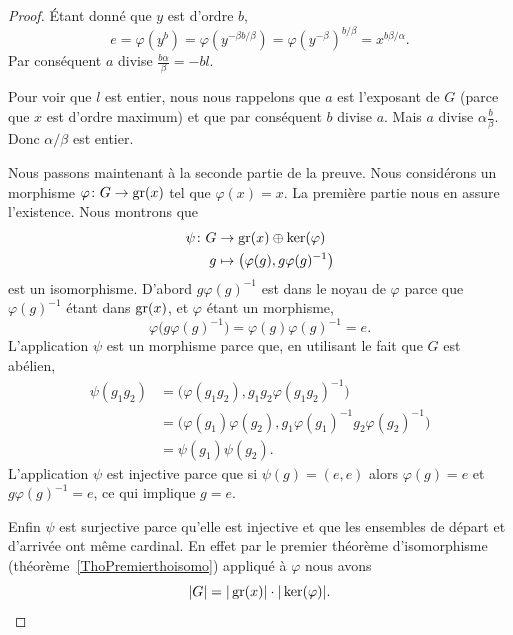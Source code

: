 \begin{proof}
    Étant donné que \( y\) est d'ordre \( b\),
    \begin{equation}
        e=\varphi(y^b)=\varphi(y^{-\beta b/\beta})=\varphi(y^{-\beta})^{b/\beta}=x^{b\beta/\alpha}.
    \end{equation}
    Par conséquent \( a\) divise \( \frac{ b\alpha }{ \beta }=-bl\).

    Pour voir que \( l\) est entier, nous nous rappelons que \( a\) est l'exposant de \( G\) (parce que \( x\) est d'ordre maximum) et que par conséquent \( b\) divise \( a\). Mais \( a\) divise \( \alpha\frac{ b }{ \beta }\). Donc \( \alpha/\beta\) est entier.

    Nous passons maintenant à la seconde partie de la preuve. Nous considérons un morphisme \( \varphi\colon G\to \operatorname{gr}(x)\) tel que \( \varphi(x)=x\). La première partie nous en assure l'existence. Nous montrons que
    \begin{equation}
        \begin{aligned}
            \psi\colon G&\to \operatorname{gr}(x)\oplus \ker(\varphi) \\
            g&\mapsto \big( \varphi(g),g\varphi(g)^{-1} \big)
        \end{aligned}
    \end{equation}
    est un isomorphisme. D'abord \( g\varphi(g)^{-1}\) est dans le noyau de \( \varphi\) parce que \( \varphi(g)^{-1}\) étant dans \( \operatorname{gr}(x)\), et \( \varphi\) étant un morphisme,
    \begin{equation}
        \varphi\big( g\varphi(g)^{-1} \big)=\varphi(g)\varphi(g)^{-1}=e.
    \end{equation}
    L'application \( \psi\) est un morphisme parce que, en utilisant le fait que \( G\) est abélien,
    \begin{subequations}
        \begin{align}
            \psi(g_1g_2)&=\big( \varphi(g_1g_2),g_1g_2\varphi(g_1g_2)^{-1} \big)\\
            &=\big( \varphi(g_1)\varphi(g_2),g_1\varphi(g_1)^{-1}g_2\varphi(g_2)^{-1} \big)\\
            &=\psi(g_1)\psi(g_2).
        \end{align}
    \end{subequations}
    L'application \( \psi\) est injective parce que si \( \psi(g)=(e,e)\) alors \( \varphi(g)=e\) et \( g\varphi(g)^{-1}=e\), ce qui implique \( g=e\).

    Enfin \( \psi\) est surjective parce qu'elle est injective et que les ensembles de départ et d'arrivée ont même cardinal. En effet par le premier théorème d'isomorphisme (théorème~\ref{ThoPremierthoisomo}) appliqué à \( \varphi\) nous avons
    \begin{equation}
        | G |=| \operatorname{gr}(x) |\cdot | \ker(\varphi) |.
    \end{equation}
\end{proof}

